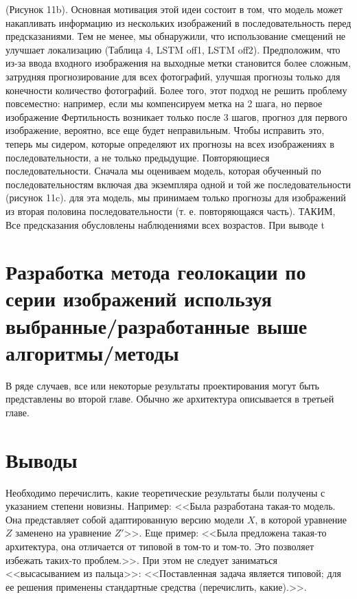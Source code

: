 (Рисунок 11b). Основная мотивация этой идеи состоит в том, что
модель может накапливать информацию из нескольких изображений в
последовательность перед предсказаниями. Тем не менее, мы
обнаружили, что использование смещений не улучшает локализацию
(Таблица 4, LSTM off1, LSTM off2). Предположим, что
из-за ввода входного изображения на выходные метки
становится более сложным, затрудняя прогнозирование
для всех фотографий, улучшая прогнозы только для конечности
количество фотографий. Более того, этот подход не
решить проблему повсеместно: например, если мы компенсируем
метка на 2 шага, но первое изображение
Фертильность возникает только после 3 шагов, прогноз для первого
изображение, вероятно, все еще будет неправильным. Чтобы исправить это, теперь мы
сидером, которые определяют их прогнозы на всех изображениях
в последовательности, а не только предыдущие. Повторяющиеся последовательности. Сначала мы оцениваем модель, которая
обученный по последовательностям
включая два экземпляра одной и той же последовательности (рисунок 11c). для
эта модель, мы принимаем только прогнозы для изображений из
вторая половина последовательности (т. е. повторяющаяся часть). ТАКИМ,
Все предсказания обусловлены наблюдениями всех
возрастов. При выводе t


\section{Разработка метода геолокации по серии изображений используя выбранные/разработанные выше алгоритмы/методы}

В ряде случаев, все или некоторые результаты проектирования могут быть представлены во второй главе. Обычно же архитектура описывается в третьей главе.

\section{Выводы}

Необходимо перечислить, какие теоретические результаты были получены с 
указанием степени новизны. Например: <<Была разработана такая-то модель. Она 
представляет собой адаптированную версию модели $X$, в которой уравнение $Z$ 
заменено на уравнение $Z'$>>. Еще пример: <<Была предложена такая-то 
архитектура, она отличается от типовой в том-то и том-то. Это позволяет 
избежать таких-то проблем.>>. При этом не следует заниматься <<высасыванием из 
пальца>>: <<Поставленная задача является типовой; для ее решения применены 
стандартные средства (перечислить, какие).>>.
